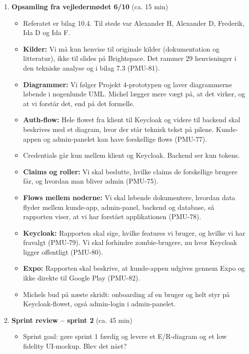 \documentclass[a4paper,11pt]{article}
\begin{document}
\begin{enumerate}
    \item \textbf{Opsamling fra vejledermødet 6/10} (ca. 15 min)
    \begin{itemize}
        \item Referatet er bilag 10.4. Til stede var Alexander H, Alexander D, Frederik, Ida D og Ida F.
        \item \textbf{Kilder:} Vi må kun henvise til originale kilder (dokumentation og litteratur), ikke til slides på Brightspace. Det rammer 29 henvisninger i den tekniske analyse og i bilag 7.3 (PMU-81).
        \item \textbf{Diagrammer:} Vi følger Projekt 4-prototypen og laver diagrammerne løbende i nogenlunde UML. Michel lægger mere vægt på, at det virker, og at vi forstår det, end på det formelle.
        \item \textbf{Auth-flow:} Hele flowet fra klient til Keycloak og videre til backend skal beskrives med et diagram, hvor der står teknisk tekst på pilene. Kunde-appen og admin-panelet kan have forskellige flows (PMU-77).
        \item Credentials går kun mellem klient og Keycloak. Backend ser kun tokens.
        \item \textbf{Claims og roller:} Vi skal beslutte, hvilke claims de forskellige brugere får, og hvordan man bliver admin (PMU-75).
        \item \textbf{Flows mellem noderne:} Vi skal løbende dokumentere, hvordan data flyder mellem kunde-app, admin-panel, backend og database, så rapporten viser, at vi har forstået applikationen (PMU-78).
        \item \textbf{Keycloak:} Rapporten skal sige, hvilke features vi bruger, og hvilke vi har fravalgt (PMU-79). Vi skal forhindre zombie-brugere, nu hvor Keycloak ligger offentligt (PMU-80).
        \item \textbf{Expo:} Rapporten skal beskrive, at kunde-appen udgives gennem Expo og ikke direkte til Google Play (PMU-82).
        \item Michels bud på næste skridt: onboarding af en bruger og helt styr på Keycloak-flowet, også admin-login i admin-panelet.
    \end{itemize}
    \item \textbf{Sprint review -- sprint 2} (ca. 45 min)
    \begin{itemize}
        \item Sprint goal: gøre sprint 1 færdig og levere et E/R-diagram og et low fidelity UI-mockup. Blev det nået?

\end{itemize}
\end{enumerate}
\end{document}
